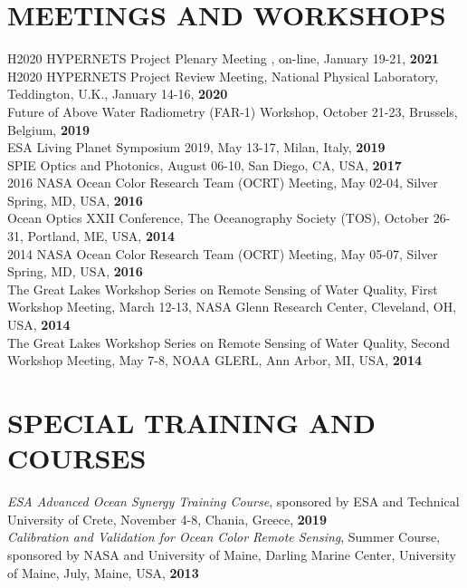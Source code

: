 \documentclass[11pt]{res}
\begin{document}
\begin{resume}
\section{MEETINGS AND WORKSHOPS}
\vspace{0.1in}
H2020 HYPERNETS Project Plenary Meeting , on-line, January 19-21, {\bf 2021}
\vspace{0.1in}\\
H2020 HYPERNETS Project Review Meeting, National Physical Laboratory, Teddington, U.K., January 14-16, {\bf 2020}
\vspace{0.1in}\\
Future of Above Water Radiometry (FAR-1) Workshop, October 21-23, Brussels, Belgium, {\bf 2019}
\vspace{0.1in}\\
ESA Living Planet Symposium 2019, May 13-17, Milan, Italy, {\bf 2019}
\vspace{0.1in}\\
SPIE Optics and Photonics,  August 06-10, San Diego, CA, USA, {\bf 2017}
\vspace{0.1in}\\
2016 NASA Ocean Color Research Team (OCRT) Meeting,  May 02-04, Silver Spring, MD, USA, {\bf 2016}
\vspace{0.1in}\\
Ocean Optics XXII Conference, The Oceanography Society (TOS),  October 26-31, Portland, ME, USA, {\bf 2014}
\vspace{0.1in}\\
2014 NASA Ocean Color Research Team (OCRT) Meeting,  May 05-07, Silver Spring, MD, USA, {\bf 2016}
\vspace{0.1in}\\
The Great Lakes Workshop Series on Remote Sensing of Water Quality, First Workshop Meeting, March 12-13, NASA Glenn Research Center, Cleveland, OH, USA, {\bf 2014}
\vspace{0.1in}\\
The Great Lakes Workshop Series on Remote Sensing of Water Quality, Second Workshop Meeting, May 7-8, NOAA GLERL, Ann Arbor, MI, USA, {\bf 2014}\\
\vspace{-0.1in}
\section{SPECIAL TRAINING AND COURSES}
\vspace{0.1in}
{\it ESA Advanced Ocean Synergy Training Course}, sponsored by ESA and Technical University of Crete, November 4-8, Chania, Greece, {\bf 2019}
\vspace{0.1in}\\
{\it Calibration and Validation for Ocean Color Remote Sensing}, Summer Course, sponsored by NASA and University of Maine, Darling Marine Center, University of Maine, July, Maine, USA, {\bf 2013}
\vspace{-0.1in}

\end{resume}
\end{document}
